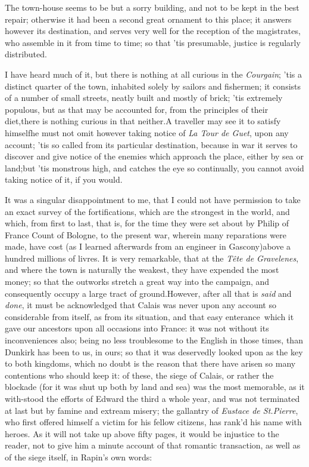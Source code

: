 \documentclass{article}
\begin{document}
The town-house seems to be but a sorry building, and not to be
kept in the best repair; otherwise it had been a second great
ornament to this place; it answers however its destination, and
serves very well for the reception of the magistrates, who assemble
in it from time to time; so that ’tis presumable, justice is
regularly distributed.

I have heard much of it, but there is nothing at all curious in
the \textit{Courgain}; ’tis a distinct quarter of the town,
inhabi\-ted solely by sailors and fishermen; it consists of a number
of small streets, neatly built and mostly of brick; ’tis
extremely populous, but as that may be accounted for, from the
principles of their diet,\tsk there is nothing curious in that
neither.\tsh A traveller may see it to satisfy
himself\tsk he must not omit however taking notice of \textit{La Tour de Guet}, upon
any account; ’tis so called from its particular destination,
because in war it serves to discover and give notice of the enemies
which approach the place, either by sea or land;\tsh but
’tis monstrous high, and catches the eye so continually, you
cannot avoid taking notice of it, if you would.

It was a singular disappointment to me, that I could not have
permission to take an exact survey of the fortifications, which are
the strongest in the world, and which, from first to last, that is,
for the time they were set about by Philip of France
Count of Bologne, to the present war, wherein many
reparations were made, have cost (as I learned afterwards from an
engineer in Gascony)\tsk above a hundred millions of
livres. It is very remarkable, that at the \textit{Tête de
Gra\-ve\-lenes}, and where the town is naturally the weakest, they
have expended the most money; so that the outworks stretch a great
way into the campaign, and consequently occupy a large tract of
ground.\break\tsk However, after all that is \textit{said} and
\textit{done}, it must be acknowledged that Calais was never
upon any account so considerable from itself, as from its
situation, and that easy enterance\sic\ which it gave our ancestors upon
all occasions into France: it was not without its
inconveniences also; being no less troublesome to the
English in those times, than Dunkirk has been to us,
in ours; so that it was deservedly looked upon as the key to both
kingdoms, which no doubt is the reason that there have arisen so
many contentions who should keep it: of these, the siege of
Calais, or rather the blockade (for it was shut up both by
land and sea) was the most memorable, as it with-stood the efforts
of Edward the third a whole year, and was not terminated at
last but by famine and extream misery; the gallantry of \textit{Eustace
de St.\@ Pierre}, who first offered himself a victim for his
fellow citizens, has rank’d his name with heroes. As it will
not take up above fifty pages, it would be injustice to the reader,
not to give him a minute account of that romantic transaction, as well
as of the siege itself, in Rapin’s own words:
\end{document}
